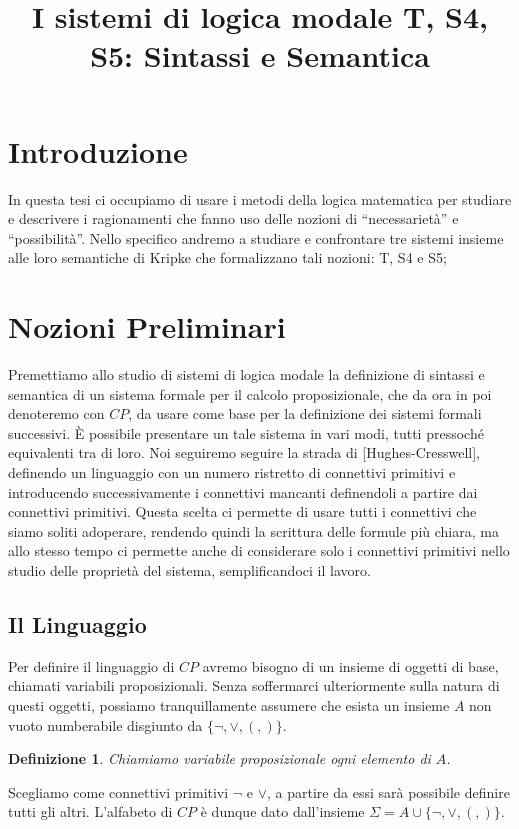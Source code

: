 \documentclass[a4paper, titlepage, 12pt]{report}
\title{I sistemi di logica modale T, S4, S5: Sintassi e Semantica}
\date{}
\newtheorem{definition}{Definizione}
\begin{document}
\maketitle
\section{Introduzione}
In questa tesi ci occupiamo di usare i metodi della logica matematica
per studiare e descrivere i ragionamenti che fanno uso delle nozioni
di ``necessarietà'' e ``possibilità''. Nello specifico andremo a studiare
e confrontare tre sistemi insieme alle loro semantiche di Kripke
che formalizzano tali nozioni: T, S4 e S5;

\section{Nozioni Preliminari}
Premettiamo allo studio di sistemi di logica modale la definizione
di sintassi e semantica di un sistema formale per il calcolo proposizionale,
che da ora in poi denoteremo con $CP$, da usare come base per la definizione
dei sistemi formali successivi.
È possibile presentare un tale sistema in vari modi, tutti pressoché equivalenti tra di loro.
Noi seguiremo seguire la strada di [Hughes-Cresswell], definendo un linguaggio con un numero ristretto
di connettivi primitivi e introducendo successivamente i connettivi mancanti definendoli a partire
dai connettivi primitivi.
Questa scelta ci permette di usare tutti i connettivi che siamo soliti adoperare,
rendendo quindi la scrittura delle formule più chiara, ma allo stesso tempo ci permette anche di
considerare solo i connettivi primitivi nello studio delle proprietà del sistema,
semplificandoci il lavoro.

\subsection{Il Linguaggio}
Per definire il linguaggio di $CP$ avremo bisogno di un insieme di oggetti di base,
chiamati variabili proposizionali. Senza soffermarci ulteriormente sulla natura di questi oggetti,
possiamo tranquillamente assumere che esista un insieme $A$ non vuoto numberabile
disgiunto da $\{\neg, \lor, (, )\}$.

\begin{definition}
Chiamiamo variabile proposizionale ogni elemento di $A$.
\end{definition}

Scegliamo come connettivi primitivi $\neg$ e $\lor$,
a partire da essi sarà possibile definire tutti gli altri.
L'alfabeto di $CP$ è dunque dato dall'insieme $\Sigma = A \cup \{\neg, \lor, (, )\}$.
\end{document}
